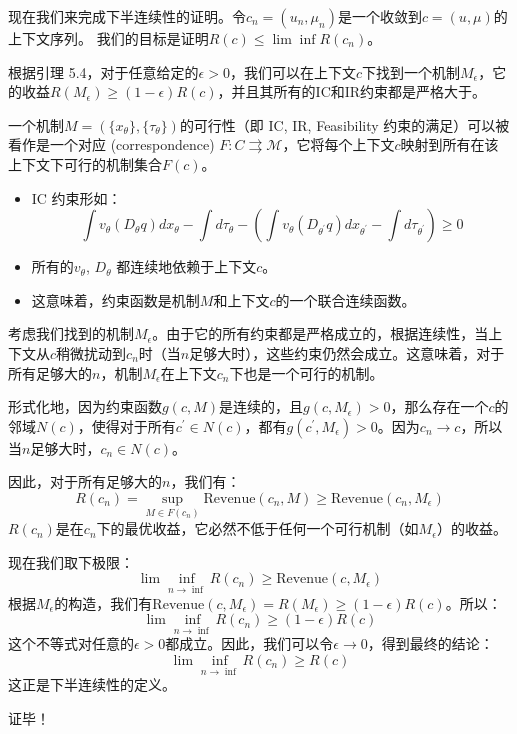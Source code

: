 现在我们来完成下半连续性的证明。令$c_n = (u_n,\mu_n)$是一个收敛到$c=(u,\mu)$的上下文序列。
我们的目标是证明$R(c)\leq \lim\inf R(c_n)$。

根据引理 5.4，对于任意给定的$\epsilon > 0$，我们可以在上下文$c$下找到一个机制$M_{\epsilon}$，它的收益$R(M_\epsilon)\geq (1-\epsilon)R(c)$，并且其所有的IC和IR约束都是严格大于。

一个机制$M=(\{x_\theta\},\{\tau_\theta\})$的可行性（即 IC, IR, Feasibility 约束的满足）可以被看作是一个对应 (correspondence)
$F:C\rightrightarrows \mathcal{M}$，它将每个上下文$c$映射到所有在该上下文下可行的机制集合$F(c)$。
\begin{itemize}
    \item IC 约束形如：$$\int v_{\theta}(D_{\theta}q)d x_{\theta} - \int d \tau_{\theta} - \left(\int v_{\theta}(D_{\theta^\prime}q)d x_{\theta^\prime} - \int d \tau_{\theta^\prime}\right)\geq 0$$
    \item 所有的$v_\theta$, $D_\theta$ 都连续地依赖于上下文$c$。
    \item 这意味着，约束函数是机制$M$和上下文$c$的一个联合连续函数。
\end{itemize}

考虑我们找到的机制$M_{\epsilon}$。由于它的所有约束都是严格成立的，根据连续性，当上下文从$c$稍微扰动到$c_n$时（当$n$足够大时），这些约束仍然会成立。这意味着，对于所有足够大的$n$，机制$M_{\epsilon}$在上下文$c_n$下也是一个可行的机制。

形式化地，因为约束函数$g(c,M)$是连续的，且$g(c, M_{\epsilon})>0$，那么存在一个$c$的邻域$N(c)$，使得对于所有$c^\prime \in N(c)$，都有$g(c^\prime,M_{\epsilon})>0$。因为$c_n\to c$，所以当$n$足够大时，$c_n \in N(c)$。

因此，对于所有足够大的$n$，我们有：
$$R(c_n)=\sup_{M\in F(c_n)} \text{Revenue}(c_n,M)\geq \text{Revenue}(c_n,M_{\epsilon})$$
$R(c_n)$是在$c_n$下的最优收益，它必然不低于任何一个可行机制（如$M_{\epsilon}$）的收益。

现在我们取下极限：
$$\lim\inf_{n\to\inf} R(c_n)\geq \text{Revenue}(c,M_{\epsilon})$$
根据$M_{\epsilon}$的构造，我们有$\text{Revenue}(c,M_{\epsilon}) = R(M_{\epsilon})\geq (1 - \epsilon)R(c)$。所以：
$$\lim\inf_{n\to\inf} R(c_n)\geq (1-\epsilon)R(c)$$
这个不等式对任意的$\epsilon>0$都成立。因此，我们可以令$\epsilon\to 0$，得到最终的结论：
$$\lim\inf_{n\to\inf}R(c_n)\geq R(c)$$
这正是下半连续性的定义。

证毕！